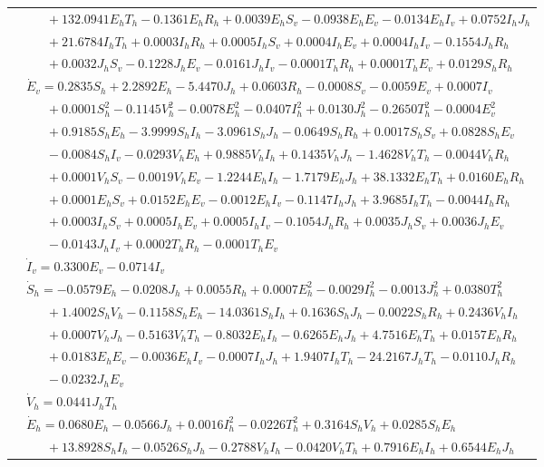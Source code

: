 \documentclass[9pt]{article}
\numberwithin{equation}{section}
\begin{document}
\begin{table}[ht]
\begin{tabularx}{1\linewidth}{|l|X|}
        & $\quad\;\;+132.0941E_hT_h-0.1361E_hR_h+0.0039E_hS_v-0.0938E_hE_v-0.0134E_hI_v+0.0752I_hJ_h$ \\
        & $\quad\;\;+21.6784I_hT_h+0.0003I_hR_h+0.0005I_hS_v+0.0004I_hE_v+0.0004I_hI_v-0.1554J_hR_h$ \\
        & $\quad\;\;+0.0032J_hS_v-0.1228J_hE_v-0.0161J_hI_v-0.0001T_hR_h+0.0001T_hE_v+0.0129S_hR_h$ \\
        & $\dot{E}_v=0.2835S_h+2.2892E_h-5.4470J_h+0.0603R_h-0.0008S_v-0.0059E_v+0.0007I_v$ \\
        & $\quad\;\;+0.0001S_h^2-0.1145V_h^2-0.0078E_h^2-0.0407I_h^2+0.0130J_h^2-0.2650T_h^2-0.0004E_v^2$ \\
        & $\quad\;\;+0.9185S_hE_h-3.9999S_hI_h-3.0961S_hJ_h-0.0649S_hR_h+0.0017S_hS_v+0.0828S_hE_v$ \\
        & $\quad\;\;-0.0084S_hI_v-0.0293V_hE_h+0.9885V_hI_h+0.1435V_hJ_h-1.4628V_hT_h-0.0044V_hR_h$ \\
        & $\quad\;\;+0.0001V_hS_v-0.0019V_hE_v-1.2244E_hI_h-1.7179E_hJ_h+38.1332E_hT_h+0.0160E_hR_h$ \\
        & $\quad\;\;+0.0001E_hS_v+0.0152E_hE_v-0.0012E_hI_v-0.1147I_hJ_h+3.9685I_hT_h-0.0044I_hR_h$ \\
        & $\quad\;\;+0.0003I_hS_v+0.0005I_hE_v+0.0005I_hI_v-0.1054J_hR_h+0.0035J_hS_v+0.0036J_hE_v$ \\
        & $\quad\;\;-0.0143J_hI_v+0.0002T_hR_h-0.0001T_hE_v$ \\
        & $\dot{I}_v=0.3300E_v-0.0714I_v$ \\
        \hline\hline
        & $\dot{S}_h=-0.0579E_h-0.0208J_h+0.0055R_h+0.0007E_h^2-0.0029I_h^2-0.0013J_h^2+0.0380T_h^2$ \\
        & $\quad\;\;+1.4002S_hV_h-0.1158S_hE_h-14.0361S_hI_h+0.1636S_hJ_h-0.0022S_hR_h+0.2436V_hI_h$ \\
        & $\quad\;\;+0.0007V_hJ_h-0.5163V_hT_h-0.8032E_hI_h-0.6265E_hJ_h+4.7516E_hT_h+0.0157E_hR_h$ \\
        & $\quad\;\;+0.0183E_hE_v-0.0036E_hI_v-0.0007I_hJ_h+1.9407I_hT_h-24.2167J_hT_h-0.0110J_hR_h$ \\
        & $\quad\;\;-0.0232J_hE_v$ \\
        & $\dot{V}_h=0.0441J_hT_h$ \\
        & $\dot{E}_h=0.0680E_h-0.0566J_h+0.0016I_h^2-0.0226T_h^2+0.3164S_hV_h+0.0285S_hE_h$ \\
        & $\quad\;\;+13.8928S_hI_h-0.0526S_hJ_h-0.2788V_hI_h-0.0420V_hT_h+0.7916E_hI_h+0.6544E_hJ_h$ \\

\end{tabularx}
\end{table}
\end{document}
